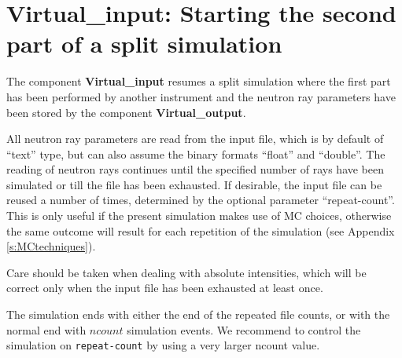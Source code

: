 \section{Virtual\_input: Starting the second part of a split simulation}
\label{virtual_input}


The component \textbf{Virtual\_input} resumes a split simulation where the
first part has been performed by another instrument and the neutron ray
parameters have been stored by the component \textbf{Virtual\_output}.

All neutron ray parameters are read from the input file, which is by default
of ``text'' type, but can also assume the binary formats
``float'' and ``double''. The reading of neutron rays continues until the
specified number of rays have been simulated or
till the file has been exhausted. If desirable, the input file
can be reused a number of times, determined by the optional parameter
``repeat-count''. This is only useful if the present simulation makes use of
MC choices, otherwise the same outcome will result for each repetition of the
simulation (see Appendix \ref{s:MCtechniques}).

Care should be taken when dealing with
absolute intensities, which will be correct only
when the input file has been exhausted at least once.

The simulation ends with either the end of the repeated file counts,
or with the normal end with $ncount$ \MCS simulation events. We recommend to
control the simulation on \verb+repeat-count+ by using
a very larger ncount value.
